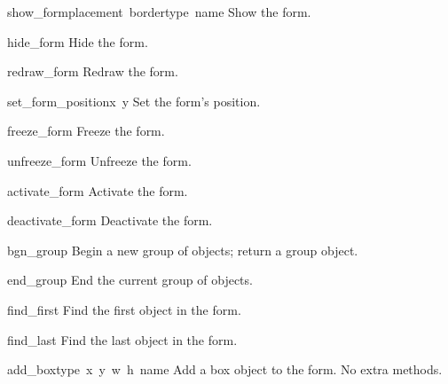 \begin{flushleft}
\renewcommand{\indexsubitem}{(form object method)}
\begin{funcdesc}{show_form}{placement\, bordertype\, name}
  Show the form.
\end{funcdesc}

\begin{funcdesc}{hide_form}{}
  Hide the form.
\end{funcdesc}

\begin{funcdesc}{redraw_form}{}
  Redraw the form.
\end{funcdesc}

\begin{funcdesc}{set_form_position}{x\, y}
Set the form's position.
\end{funcdesc}

\begin{funcdesc}{freeze_form}{}
Freeze the form.
\end{funcdesc}

\begin{funcdesc}{unfreeze_form}{}
  Unfreeze the form.
\end{funcdesc}

\begin{funcdesc}{activate_form}{}
  Activate the form.
\end{funcdesc}

\begin{funcdesc}{deactivate_form}{}
  Deactivate the form.
\end{funcdesc}

\begin{funcdesc}{bgn_group}{}
  Begin a new group of objects; return a group object.
\end{funcdesc}

\begin{funcdesc}{end_group}{}
  End the current group of objects.
\end{funcdesc}

\begin{funcdesc}{find_first}{}
  Find the first object in the form.
\end{funcdesc}

\begin{funcdesc}{find_last}{}
  Find the last object in the form.
\end{funcdesc}


\begin{funcdesc}{add_box}{type\, x\, y\, w\, h\, name}
Add a box object to the form.
No extra methods.
\end{funcdesc}


\end{flushleft}
